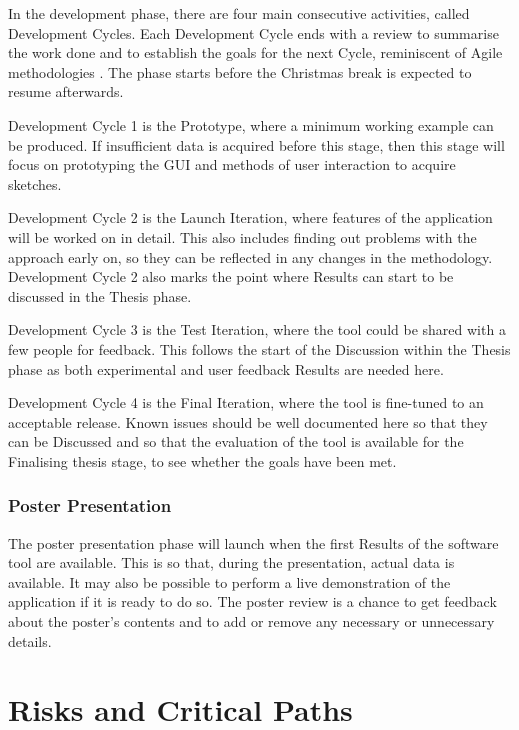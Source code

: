 \documentclass{article}
\begin{document}
In the development phase, there are four main consecutive activities, called Development Cycles. Each Development Cycle ends 
with a review to summarise the work done and to establish the goals for the next Cycle, reminiscent of Agile methodologies \cite{7965431}. The
phase starts before the Christmas break is expected to resume afterwards.

Development Cycle 1 is the Prototype, where a minimum working example can be produced. If insufficient data is acquired before this stage,
then this stage will focus on prototyping the \gls{GUI} and methods of user interaction to acquire sketches.

Development Cycle 2 is the Launch Iteration, where features of the application will be worked on in detail. This also includes
finding out problems with the approach early on, so they can be reflected in any changes in the methodology. Development Cycle 2 also
marks the point where Results can start to be discussed in the Thesis phase.

Development Cycle 3 is the Test Iteration, where the tool could be shared with a few people for feedback. This 
follows the start of the Discussion within the Thesis phase as both experimental and user feedback Results are needed 
here.

Development Cycle 4 is the Final Iteration, where the tool is fine-tuned to an acceptable release. Known issues should be 
well documented here so that they can be Discussed and so that the evaluation of the tool is available for the Finalising 
thesis stage, to see whether the goals have been met.

\subsubsection{Poster Presentation}
\label{subsubsec:Poster Presentation}

The poster presentation phase will launch when the first Results of the software tool are available. This is so that, during the presentation,
actual data is available. It may also be possible to perform a live demonstration of the application if it is ready to do so. The 
poster review is a chance to get feedback about the poster's contents and to add or remove any necessary or unnecessary details.

\pagebreak
\section{Risks and Critical Paths}
\label{subsec:Risks and Critical Paths}
\end{document}
